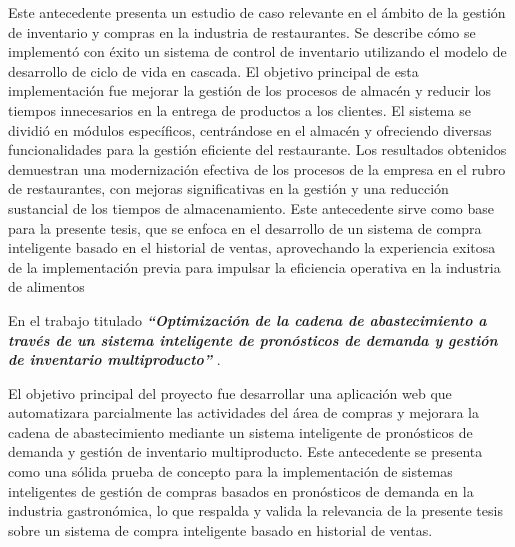 Este antecedente presenta un estudio de caso relevante en el ámbito de la gestión de inventario y compras en la industria de restaurantes. Se describe cómo se implementó con éxito un sistema de control de inventario utilizando el modelo de desarrollo de ciclo de vida en cascada. El objetivo principal de esta implementación fue mejorar la gestión de los procesos de almacén y reducir los tiempos innecesarios en la entrega de productos a los clientes. El sistema se dividió en módulos específicos, centrándose en el almacén y ofreciendo diversas funcionalidades para la gestión eficiente del restaurante. Los resultados obtenidos demuestran una modernización efectiva de los procesos de la empresa en el rubro de restaurantes, con mejoras significativas en la gestión y una reducción sustancial de los tiempos de almacenamiento. Este antecedente sirve como base para la presente tesis, que se enfoca en el desarrollo de un sistema de compra inteligente basado en el historial de ventas, aprovechando la experiencia exitosa de la implementación previa para impulsar la eficiencia operativa en la industria de alimentos



\vspace{1\baselineskip}
En el trabajo titulado \textbf{\textit{ “Optimización de la cadena de abastecimiento a través de un sistema inteligente de pronósticos de demanda y gestión de inventario multiproducto”}} \cite{pacheco2015rediseno}. 

El objetivo principal del proyecto fue desarrollar una aplicación web que automatizara parcialmente las actividades del área de compras y mejorara la cadena de abastecimiento mediante un sistema inteligente de pronósticos de demanda y gestión de inventario multiproducto. 
Este antecedente se presenta como una sólida prueba de concepto para la implementación de sistemas inteligentes de gestión de compras basados en pronósticos de demanda en la industria gastronómica, lo que respalda y valida la relevancia de la presente tesis sobre un sistema de compra inteligente basado en historial de ventas.


